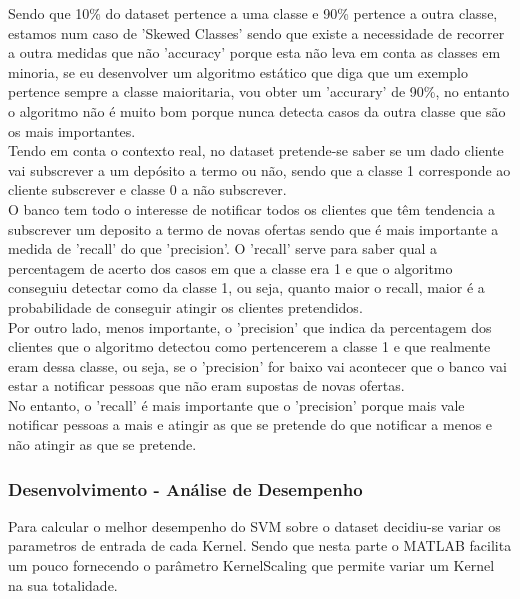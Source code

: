 \documentclass[portugues,final]{revdetua}
\begin{document}
Sendo que 10\% do dataset pertence a uma classe e 90\% pertence a outra classe, estamos num caso de 'Skewed Classes' sendo que existe a necessidade de recorrer a outra medidas que não 'accuracy' porque esta não leva em conta as classes em minoria, se eu desenvolver um algoritmo estático que diga que um exemplo pertence sempre a classe maioritaria, vou obter um 'accurary' de 90\%, no entanto o algoritmo não é muito bom porque nunca detecta casos da outra classe que são os mais importantes.\\

Tendo em conta o contexto real, no dataset pretende-se saber se um dado cliente vai subscrever a um depósito a termo ou não, sendo que a classe 1 corresponde ao cliente subscrever e classe 0 a não subscrever.\\

O banco tem todo o interesse de notificar todos os clientes que têm tendencia a subscrever um deposito a termo de novas ofertas sendo que é mais importante a medida de 'recall' do que 'precision'. O 'recall' serve para saber qual a percentagem de acerto dos casos em que a classe era 1 e que o algoritmo conseguiu detectar como da classe 1, ou seja, quanto maior o recall, maior é a probabilidade de conseguir atingir os clientes pretendidos.\\

Por outro lado, menos importante, o 'precision' que indica da percentagem dos clientes que o algoritmo detectou como pertencerem a classe 1 e que realmente eram dessa classe, ou seja, se o 'precision' for baixo vai acontecer que o banco vai estar a notificar pessoas que não eram supostas de novas ofertas.\\

No entanto, o 'recall' é mais importante que o 'precision' porque mais vale notificar pessoas a mais e atingir as que se pretende do que notificar a menos e não atingir as que se pretende.

\subsubsection{Desenvolvimento - Análise de Desempenho}

Para calcular o melhor desempenho do SVM sobre o dataset decidiu-se variar os parametros de entrada de cada Kernel. Sendo que nesta parte o MATLAB facilita um pouco fornecendo o parâmetro KernelScaling que permite variar um Kernel na sua totalidade.\\
\end{document}
